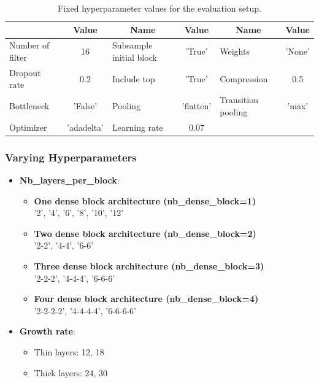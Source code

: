 \begin{table}[ht]
\centering
\caption{Fixed hyperparameter values for the evaluation setup.}
\resizebox{\textwidth}{!}
{\begin{tabular}{|l c| l c| l c|} 
 \hline\hline
 \rowcolor{lightgrey}
 \multicolumn{1}{|c}{\textbf{Name}} & \multicolumn{1}{c|}{\textbf{Value}} & \multicolumn{1}{c}{\textbf{Name}} & \multicolumn{1}{c|}{\textbf{Value}} & \multicolumn{1}{c}{\textbf{Name}} & \multicolumn{1}{c|}{\textbf{Value}} \\ [0.5ex] 
 \hline
 Number of filter & 16 & Subsample initial block & 'True' & Weights & 'None'\\
 \hline
 Dropout rate & 0.2 & Include top & 'True' & Compression & 0.5\\
 \hline
 Bottleneck & 'False' & Pooling & 'flatten' & Transition pooling & 'max' \\
 \hline
 Optimizer & 'adadelta' & Learning rate & 0.07 & & \\
 \hline \hline
\end{tabular}}
\label{table:architecture_densenet_siamese}
\end{table}

\subsubsection{Varying Hyperparameters}

 \begin{itemize}
 \item \textbf{Nb\_layers\_per\_block}:
 \begin{itemize}
  \item \textbf{One dense block architecture (nb\_dense\_block=1)}\\
  '2', '4', '6', '8', '10', '12'
  \item \textbf{Two dense block architecture (nb\_dense\_block=2)}\\
  '2-2', '4-4', '6-6'
  \item \textbf{Three dense block architecture (nb\_dense\_block=3)}\\
  '2-2-2', '4-4-4', '6-6-6'
  \item \textbf{Four dense block architecture (nb\_dense\_block=4)}\\
  '2-2-2-2', '4-4-4-4', '6-6-6-6'
 \end{itemize}
 \item \textbf{Growth rate}:
 \begin{itemize}
 \item Thin layers: 12, 18
 \item Thick layers: 24, 30  
 \end{itemize} 
\end{itemize}
 
